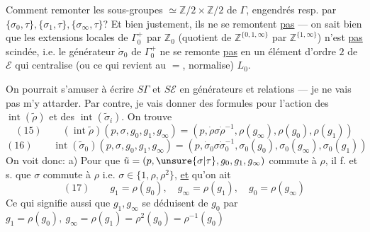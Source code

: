 Comment remonter les sous-groupes  $\simeq\mathbb Z/2\times\mathbb Z/2$ de $\Gamma$, engendrés resp. par $\{\sigma_0,\tau\},\{\sigma_1,\tau\},\{\sigma_\infty,\tau\}$? Et bien justement, ils ne se remontent \uline{pas} --- on sait bien que les extensions locales de $\Gamma_0^+$  par $\mathbb Z_0$ (quotient de $\mathbb Z^{\{0,1,\infty\}}$ par $\mathbb Z^{\{1,\infty\}}$) n'est \uline{pas} scindée, i.e. le générateur $\dot\sigma_0$ de $\Gamma_0^+$ ne se remonte \uline{pas} en un élément d'ordre $2$ de $\mathcal E$ qui centralise (ou ce qui revient au $=$, normalise) $L_0$.

On pourrait s'amuser à écrire $S\Gamma$ et $S\mathcal E$ en générateurs et relations --- je ne vais pas m'y attarder. Par contre, je vais donner des formules pour l'action des $\operatorname{int}(\tilde\rho)$ et des $\operatorname{int}(\tilde\sigma_i)$. On trouve
\[
(15)\qquad(\operatorname{int}\tilde\rho)(p,\sigma,g_0,g_1,g_\infty)=(p,\dot\rho\sigma\dot\rho^{-1},\rho(g_\infty),\rho(g_0),\rho(g_1))
\]
\[
(16)\qquad\operatorname{int}(\tilde\sigma_0)(p,\sigma,g_0,g_1,g_\infty)=(p,\dot\sigma_0\sigma\dot\sigma_0^{-1},\sigma_0(g_0),\sigma_0(g_\infty),\sigma_0(g_1))
\]
On voit donc: a) Pour que $\tilde u=(p,\unsure{\sigma|\tau},g_0,g_1,g_\infty)$ commute à $\rho$, il f. et s. que  $\sigma$ commute à $\rho$ i.e. $\sigma\in\{1,\rho,\rho^2\}$, \uline{et} qu'on ait
\[
(17)\qquad g_1=\rho(g_0),\quad g_\infty=\rho(g_1),\quad g_0=\rho(g_\infty)
\]
Ce qui signifie aussi que $g_1,g_\infty$ se déduisent de $g_0$ par $g_1=\rho(g_0),\ g_\infty=\rho(g_1)=\rho^2(g_0)=\rho^{-1}(g_0)$
